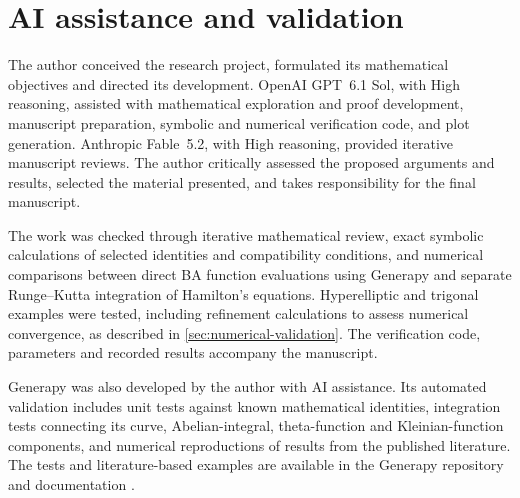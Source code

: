 \section*{AI assistance and validation}

The author conceived the research project, formulated its mathematical
objectives and directed its development. OpenAI GPT~6.1 Sol, with High
reasoning, assisted with mathematical exploration and proof development,
manuscript preparation, symbolic and numerical verification code, and
plot generation. Anthropic Fable~5.2, with High reasoning, provided
iterative manuscript reviews. The author critically assessed the proposed
arguments and results, selected the material presented, and takes
responsibility for the final manuscript.

The work was checked through iterative mathematical review, exact
symbolic calculations of selected identities and compatibility conditions,
and numerical comparisons between direct BA function evaluations using
Generapy and separate Runge--Kutta integration of Hamilton's equations.
Hyperelliptic and trigonal examples were tested, including refinement
calculations to assess numerical convergence, as described in
\cref{sec:numerical-validation}. The verification code, parameters and
recorded results accompany the manuscript.

Generapy was also developed by the author with AI assistance. Its
automated validation includes unit tests against known mathematical
identities, integration tests connecting its curve, Abelian-integral,
theta-function and Kleinian-function components, and numerical
reproductions of results from the published literature. The tests and
literature-based examples are available in the Generapy repository and
documentation \cite{Generapy}.
